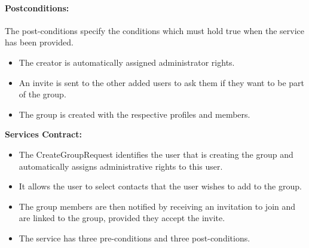\documentclass[11pt]{article}
\begin{document}
\paragraph{{Postconditions:}}The post-conditions specify the conditions which must hold true when the service has been provided.
\begin{itemize}
\item	The creator is automatically assigned administrator rights.
\item	An invite is sent to the other added users to ask them if they want to be part of the group.
\item	The group is created with the respective profiles and members.
\end{itemize}
\textbf{Services Contract:}
\begin{itemize}
\item The CreateGroupRequest identifies the user that is creating the group and automatically assigns administrative rights to this user.
\item It allows the user to select contacts that the user wishes to add to the group.
\item The group members are then notified by receiving an invitation to join and are linked to the group, provided they accept the invite.
\item The service has three pre-conditions and three post-conditions.
\end{itemize}
\end{document}
